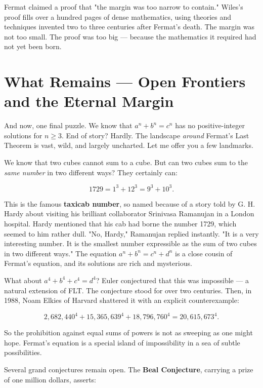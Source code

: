 \documentclass[11pt,openright,twoside]{book}
\theoremstyle{definition}
\begin{document}
Fermat claimed a proof that "the margin was too narrow to contain." Wiles's proof fills over a hundred pages of dense mathematics, using theories and techniques invented two to three centuries after Fermat's death. The margin was not too small. The proof was too big --- because the mathematics it required had not yet been born.


\bigskip


\section{What Remains — Open Frontiers and the Eternal Margin}

And now, one final puzzle. We know that $a^n + b^n = c^n$ has no positive-integer solutions for $n \ge 3$. End of story? Hardly. The landscape \textit{around} Fermat's Last Theorem is vast, wild, and largely uncharted. Let me offer you a few landmarks.

We know that two cubes cannot sum to a cube. But can two cubes sum to the \textit{same number} in two different ways? They certainly can:

\[1729 = 1^3 + 12^3 = 9^3 + 10^3.\]

This is the famous \textbf{taxicab number}, so named because of a story told by G. H. Hardy about visiting his brilliant collaborator Srinivasa Ramanujan in a London hospital. Hardy mentioned that his cab had borne the number 1729, which seemed to him rather dull. "No, Hardy," Ramanujan replied instantly. "It is a very interesting number. It is the smallest number expressible as the sum of two cubes in two different ways." The equation $a^n + b^n = c^n + d^n$ is a close cousin of Fermat's equation, and its solutions are rich and mysterious.

What about $a^4 + b^4 + c^4 = d^4$? Euler conjectured that this was impossible --- a natural extension of FLT. The conjecture stood for over two centuries. Then, in 1988, Noam Elkies of Harvard shattered it with an explicit counterexample:

\[2{,}682{,}440^4 + 15{,}365{,}639^4 + 18{,}796{,}760^4 = 20{,}615{,}673^4.\]

So the prohibition against equal sums of powers is not as sweeping as one might hope. Fermat's equation is a special island of impossibility in a sea of subtle possibilities.

Several grand conjectures remain open. The \textbf{Beal Conjecture}, carrying a prize of one million dollars, asserts:
\end{document}
